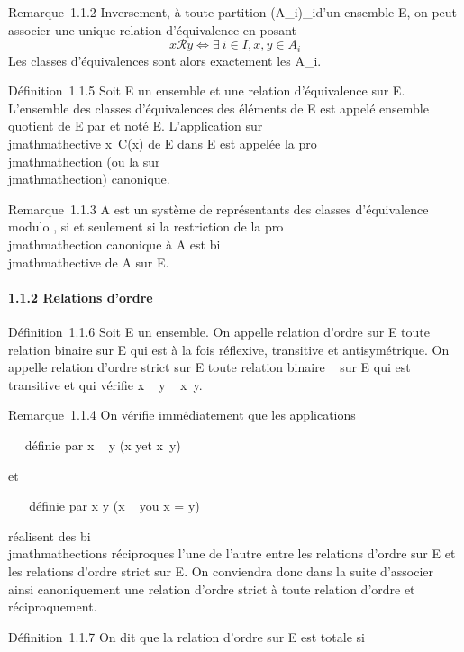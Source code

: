Remarque~1.1.2 Inversement, à toute partition
(A_i)_i\inI d'un ensemble E, on peut associer une unique
relation d'équivalence en posant
\[
x\mathcal{R}y \Leftrightarrow \exists~i \in I, x,y \in
A_i
\]
Les classes d'équivalences sont alors exactement les A_i.

Définition~1.1.5 Soit E un ensemble et  une relation d'équivalence sur
E. L'ensemble des classes d'équivalences des éléments de E est appelé
ensemble quotient de E par  et noté E\diagup{}. L'application sur\\jmathmathective
x\mapsto~C(x) de E dans E\diagup{} est appelée la
pro\\jmathmathection (ou la sur\\jmathmathection) canonique.

Remarque~1.1.3 A est un système de représentants des classes
d'équivalence modulo , si et seulement si la restriction de la
pro\\jmathmathection canonique à A est bi\\jmathmathective de A sur E\diagup{}.

\paragraph{1.1.2 Relations d'ordre}

Définition~1.1.6 Soit E un ensemble. On appelle relation d'ordre sur E
toute relation binaire \leqslant sur E qui est à la fois réflexive, transitive
et antisymétrique. On appelle relation d'ordre strict sur E toute
relation binaire \prec~ sur E qui est transitive et qui vérifie x \prec~ y \rigtharrow~
x\neq~y.

Remarque~1.1.4 On vérifie immédiatement que les applications

\leqslant \mapsto~ \prec~\text définie par x \prec~
y \Leftrightarrow (x \leqslant y\text et
x\neq~y)

et

\prec~ \mapsto~ \leqslant\text définie par x \leqslant
y \Leftrightarrow (x \prec~ y\text ou x = y)

réalisent des bi\\jmathmathections réciproques l'une de l'autre entre les
relations d'ordre sur E et les relations d'ordre strict sur E. On
conviendra donc dans la suite d'associer ainsi canoniquement une
relation d'ordre strict à toute relation d'ordre et réciproquement.

Définition~1.1.7 On dit que la relation d'ordre \leqslant sur E est totale si

